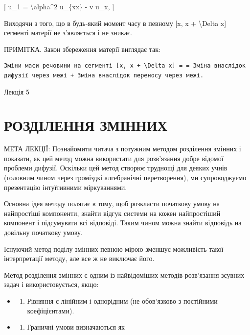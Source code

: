 \documentclass[
]{article}
\providecommand{\tightlist}{%
  \setlength{\itemsep}{0pt}\setlength{\parskip}{0pt}}
\begin{document}
{[} u\_1 = \textbackslash alpha\^{}2 u\_\{xx\} - v u\_x, {]}

Виходячи з того, що в будь-який момент часу в певному {[}x, x +
\textbackslash Delta x{]} сегменті матерії не з'являється і не зникає.

ПРИМІТКА. Закон збереження матерії виглядає так:

\begin{verbatim}
Зміни маси речовини на сегменті [x, x + \Delta x] = = Зміна внаслідок дифузії через межі + Зміна внаслідок переносу через межі.
\end{verbatim}

Лекція 5

\section{РОЗДІЛЕННЯ
ЗМІННИХ}\label{ux440ux43eux437ux434ux456ux43bux435ux43dux43dux44f-ux437ux43cux456ux43dux43dux438ux445}

МЕТА ЛЕКЦІЇ: Познайомити читача з потужним методом розділення змінних і
показати, як цей метод можна використати для розв'язання добре відомої
проблеми дифузії. Оскільки цей метод створює труднощі для деяких учнів
(головним чином через громіздкі алгебранічні перетворення), ми
супроводжуємо презентацію інтуїтивними міркуваннями.

Основна ідея методу полягає в тому, щоб розкласти початкову умову на
найпростіші компоненти, знайти відгук системи на кожен найпростіший
компонент і підсумувати всі відповіді. Таким чином можна знайти
відповідь на довільну початкову умову.

Існуючий метод поділу змінних певною мірою зменшує можливість такої
інтерпретації методу, але все ж не виключає його.

Метод розділення змінних є одним із найвідоміших методів розв'язання
зсувних задач і використовується, якщо:

\begin{itemize}
\tightlist
\item
  \begin{enumerate}
  \def\labelenumi{\arabic{enumi}.}
  \tightlist
  \item
    Рівняння є лінійним і однорідним (не обов'язково з постійними
    коефіцієнтами).
  \end{enumerate}
\item
  \begin{enumerate}
  \def\labelenumi{\arabic{enumi}.}
  \setcounter{enumi}{1}
  \tightlist
  \item
    Граничні умови визначаються як
  \end{enumerate}
\end{itemize}
\end{document}
